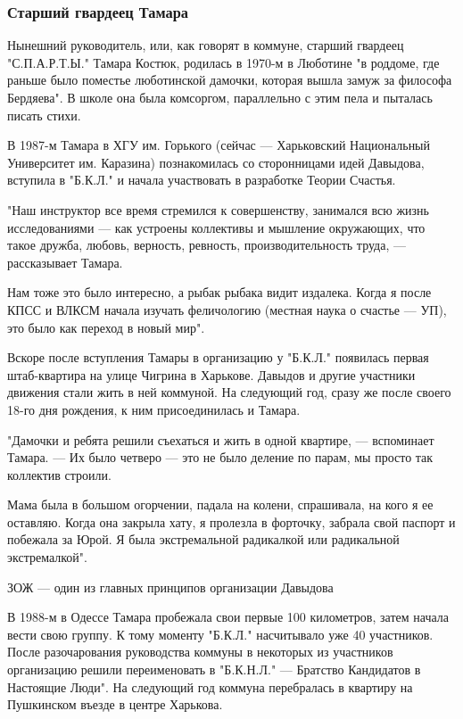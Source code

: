 \subsubsection{Старший гвардеец Тамара}

Нынешний руководитель, или, как говорят в коммуне, старший гвардеец
"С.П.А.Р.Т.Ы." Тамара Костюк, родилась в 1970-м в Люботине "в роддоме, где
раньше было поместье люботинской дамочки, которая вышла замуж за философа
Бердяева". В школе она была комсоргом, параллельно с этим пела и пыталась
писать стихи.

В 1987-м Тамара в ХГУ им. Горького (сейчас --- Харьковский Национальный
Университет им. Каразина) познакомилась со сторонницами идей Давыдова, вступила
в "Б.К.Л." и начала участвовать в разработке Теории Счастья.

"Наш инструктор все время стремился к совершенству, занимался всю жизнь
исследованиями --- как устроены коллективы и мышление окружающих, что такое
дружба, любовь, верность, ревность, производительность труда, --- рассказывает
Тамара.

Нам тоже это было интересно, а рыбак рыбака видит издалека. Когда я после КПСС
и ВЛКСМ начала изучать феличологию (местная наука о счастье --- УП), это было как
переход в новый мир".

Вскоре после вступления Тамары в организацию у "Б.К.Л." появилась первая
штаб-квартира на улице Чигрина в Харькове. Давыдов и другие участники движения
стали жить в ней коммуной. На следующий год, сразу же после своего 18-го дня
рождения, к ним присоединилась и Тамара.

"Дамочки и ребята решили съехаться и жить в одной квартире, --- вспоминает
Тамара. --- Их было четверо --- это не было деление по парам, мы просто так
коллектив строили. 

Мама была в большом огорчении, падала на колени, спрашивала, на кого я ее
оставляю. Когда она закрыла хату, я пролезла в форточку, забрала свой паспорт и
побежала за Юрой. Я была экстремальной радикалкой или радикальной
экстремалкой".

ЗОЖ --- один из главных принципов организации Давыдова

В 1988-м в Одессе Тамара пробежала свои первые 100 километров, затем начала
вести свою группу. К тому моменту "Б.К.Л." насчитывало уже 40 участников. После
разочарования руководства коммуны в некоторых из участников организацию решили
переименовать в "Б.К.Н.Л." --- Братство Кандидатов в Настоящие Люди". На
следующий год коммуна перебралась в квартиру на Пушкинском въезде в центре
Харькова.

